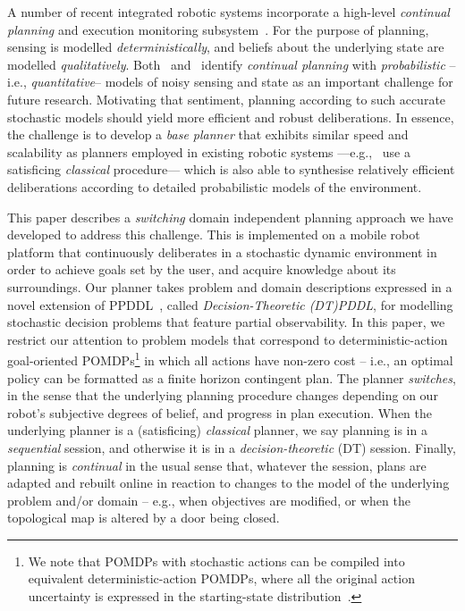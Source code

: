 



A number of recent integrated robotic systems incorporate a
high-level {\em continual planning} and execution monitoring
subsystem~\cite{wyattetal2010tamd,talamadupula:2010,Kraft2008}.
For the purpose of planning, sensing is modelled {\em
deterministically}, and beliefs about the underlying state are
modelled {\em qualitatively}.
Both~\citeauthor{talamadupula:2010} and~\citeauthor{wyattetal2010tamd}
identify
\emph{continual planning} with {\em probabilistic} --i.e., {\em quantitative}--
models of noisy sensing and state as an important challenge for future
research.
Motivating that sentiment, planning according to such accurate
stochastic models should yield more efficient and robust
deliberations.
In essence, the challenge is to develop a {\em base planner} that
exhibits similar speed and scalability as planners employed in
existing robotic systems ---e.g.,~\citeauthor{wyattetal2010tamd} use a
satisficing {\em classical} procedure--- which is also able to
synthesise relatively efficient deliberations according to detailed
probabilistic models of the environment.


This paper describes a {\em switching} domain independent planning
approach we have developed to address this challenge. This is
implemented on a mobile robot platform that continuously deliberates
in a stochastic dynamic environment in order to achieve goals set by
the user, and acquire knowledge about its surroundings.
Our planner takes problem and domain descriptions expressed in a novel
extension of PPDDL~\cite{younes:etal:2005}, called {\em
Decision-Theoretic (DT)PDDL}, for modelling stochastic decision
problems that feature partial observability.  In this paper, we
restrict our attention to problem models that correspond to
deterministic-action goal-oriented POMDPs\footnote{We note that POMDPs
with stochastic actions can be compiled into equivalent
deterministic-action POMDPs, where all the original action uncertainty
is expressed in the starting-state
distribution~\cite{ng:Jordan:2000}.} in which all actions have non-zero
cost -- i.e., an optimal policy
can be formatted as a finite horizon contingent plan.  The planner
{\em switches}, in the sense that the underlying planning procedure
changes depending on our robot's subjective degrees of belief, and
progress in plan execution. When the underlying planner is a
(satisficing) {\em classical} planner, we say planning is in a {\em
sequential} session, and otherwise it is in a {\em decision-theoretic}
(DT) session. Finally, planning is {\em continual} in the usual sense
that, whatever the session, plans are adapted and rebuilt online in
reaction to changes to the model of the underlying problem and/or
domain -- e.g., when objectives are modified, or when the topological
map is altered by a door being closed.


